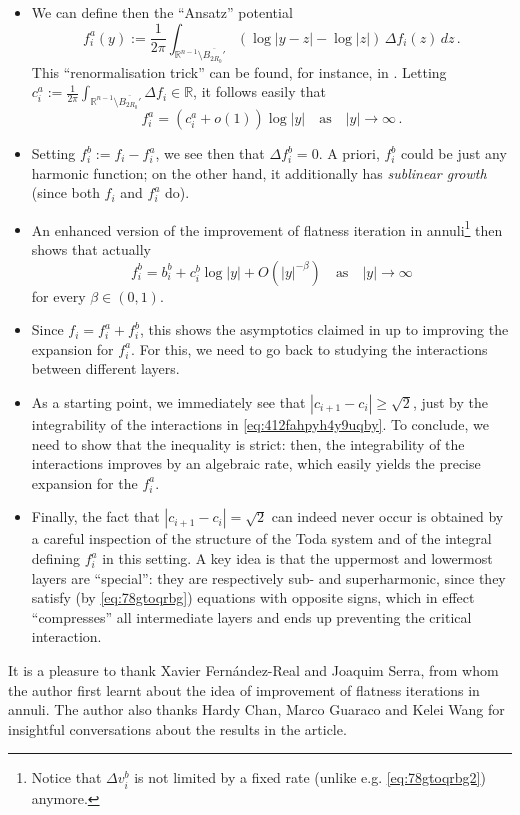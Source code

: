\documentclass{article}
\newcommand{\R}{\mathbb{R}}
\theoremstyle{definition}
\begin{document}
\begin{itemize}
\begin{itemize}
    \item We can define then the ``Ansatz'' potential
    $$f_i^a(y):=\frac{1}{2\pi}\int_{\R^{n-1}\setminus \overline{B_{2R_0}'}} (\log|y-z|-\log |z|)\, \Delta f_i(z)\,dz\,.$$
    This ``renormalisation trick'' can be found, for instance, in \cite{CL91}. Letting $ c_i^a:=\frac{1}{2\pi}\int_{\R^{n-1}\setminus \overline{B_{2R_0}'}} \Delta f_i\in\R$, it follows easily that
    $$f_i^a = (c_i^a+o(1))\log|y|\quad\mbox{as}\quad|y|\to\infty\,.$$
    \item Setting $f_i^b:=f_i-f_i^a$, we see then that $\Delta f_i^b= 0$. A priori, $f_i^b$ could be just any harmonic function; on the other hand, it additionally has {\it sublinear growth} (since both $f_i$ and $f_i^a$ do).
    \item An enhanced version of the improvement of flatness iteration in annuli\footnote{Notice that $\Delta v_i^b$ is not limited by a fixed rate (unlike e.g. \eqref{eq:78gtoqrbg2}) anymore.} then shows that actually $$f_i^b=b_i^b+c_i^b\log|y|+O(|y|^{-\beta})\quad\mbox{as}\quad|y|\to\infty$$
    for every $\beta\in(0,1)$.
    \item Since $f_i=f_i^a+f_i^b$, this shows the asymptotics claimed in  up to improving the expansion for $f_i^a$. For this, we need to go back to studying the interactions between different layers.
    \item As a starting point, we immediately see that $|c_{i+1}-c_i|\geq \sqrt{2}$, just by the integrability of the interactions in \eqref{eq:412fahpyh4y9uqby}. To conclude, we need to show that the inequality is strict: then, the integrability of the interactions improves by an algebraic rate, which easily yields the precise expansion for the $f_i^a$.
    \item Finally, the fact that $|c_{i+1}-c_i|= \sqrt{2}$ can indeed never occur is obtained by a careful inspection of the structure of the Toda system and of the integral defining $f_i^a$ in this setting. A key idea is that the uppermost and lowermost layers are ``special'': they are respectively sub- and superharmonic, since they satisfy (by \eqref{eq:78gtoqrbg}) equations with opposite signs, which in effect ``compresses'' all intermediate layers and ends up preventing the critical interaction.
\end{itemize} 
\end{itemize}


 It is a pleasure to thank Xavier Fern\'andez-Real and Joaquim Serra, from whom the author first learnt about the idea of improvement of flatness iterations in annuli. The author also thanks Hardy Chan, Marco Guaraco and Kelei Wang for insightful conversations about the results in the article.
\end{document}
